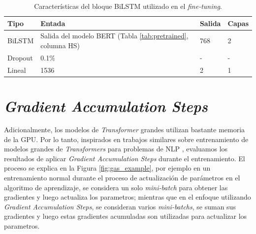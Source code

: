 \begin{table}[t]%
	\centering
	\caption{Características del bloque BiLSTM utilizado en el \textit{fine-tuning}.}
	\label{tab:biLSTM}%
	\setlength{\tabcolsep}{0.5em} %
	{\renewcommand{\arraystretch}{1.5}%
		\begin{tabular}{lp{9cm}p{1cm}p{1cm}}
			\hline
			\textbf{Tipo}   & \textbf{Entada} & \textbf{Salida}& \textbf{Capas} \\ \hline
			
			BiLSTM & Salida del modelo BERT (Tabla \ref{tab:pretrained}, columna HS) & 768 & 2 \\
			
			Dropout & 0.1\% & - & - \\
			Lineal & 1536 & 2 & 1 \\ \hline
	\end{tabular}}
	
\end{table}



\section{\textit{Gradient Accumulation Steps}}\label{sec:gas}

Adicionalmente, los modelos de \textit{Transformer} grandes utilizan bastante memoria de la GPU. Por lo tanto, inspirados en trabajos similares sobre entrenamiento de modelos grandes de \textit{Transformers} para problemas de NLP \citep{anil2021large,zhang2023adam,huang2023measuring}, evaluamos los resultados de aplicar \textit{Gradient Accumulation Steps} durante el entrenamiento. El proceso se explica en la Figura \ref{fig:gas_example}, por ejemplo en un entrenamiento normal durante el proceso de actualización de parámetros en el algoritmo de aprendizaje, se considera un solo \textit{mini-batch} para obtener las gradientes y luego actualiza los parametros; mientras que en el enfoque utilizando \textit{Gradient Accumulation Steps}, se consideran varios \textit{mini-batchs}, se suman sus gradientes y luego estas gradientes acumuladas son utilizadas para actualizar los parametros.



